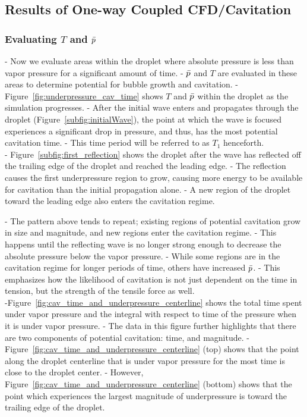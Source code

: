 \documentclass{UCF_ETD}
\begin{document}
\subsection{Results of One-way Coupled CFD/Cavitation}

\subsubsection{Evaluating $T$ and $\Bar{p}$}

- Now we evaluate areas within the droplet where absolute pressure is less than vapor pressure for a significant amount of time.
- $\Bar{p}$ and $T$ are evaluated in these areas to determine potential for bubble growth and cavitation.
- Figure~\ref{fig:underpressure_cav_time} shows $T$ and $\Bar{p}$ within the droplet as the simulation progresses. 
- After the initial wave enters and propagates through the droplet (Figure~\ref{subfig:initialWave}), the point at which the wave is focused experiences a significant drop in pressure, and thus, has the most potential cavitation time.
- This time period will be referred to as $T_{1}$ henceforth. \\

- Figure~\ref{subfig:first_reflection} shows the droplet after the wave has reflected off the trailing edge of the droplet and reached the leading edge. 
- The reflection causes the first underpressure region to grow, causing more energy to be available for cavitation than the initial propagation alone.
- A new region of the droplet toward the leading edge also enters the cavitation regime.

- The pattern above tends to repeat; existing regions of potential cavitation grow in size and magnitude, and new regions enter the cavitation regime.
- This happens until the reflecting wave is no longer strong enough to decrease the absolute pressure below the vapor pressure.
- While some regions are in the cavitation regime for longer periods of time, others have increased $\Bar{p}$.
- This emphasizes how the likelihood of cavitation is not just dependent on the time in tension, but the strength of the tensile force as well.\\

-Figure~\ref{fig:cav_time_and_underpressure_centerline} shows the total time spent under vapor pressure and the integral with respect to time of the pressure when it is under vapor pressure.
- The data in this figure further highlights that there are two components of potential cavitation: time, and magnitude.
- Figure~\ref{fig:cav_time_and_underpressure_centerline} (top) shows that the point along the droplet centerline that is under vapor pressure for the most time is close to the droplet center.
- However, Figure~\ref{fig:cav_time_and_underpressure_centerline} (bottom) shows that the point which experiences the largest magnitude of underpressure is toward the trailing edge of the droplet.
\end{document}
